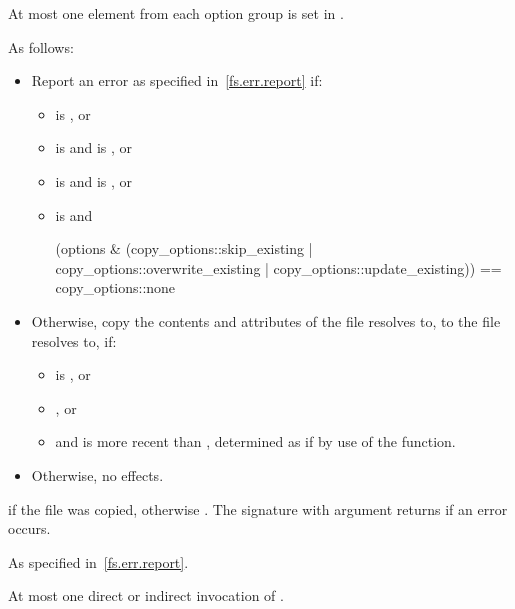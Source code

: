 \begin{itemdescr}
\pnum
\expects
At most one element from each
option group is set
in .

\pnum
\effects
As follows:
\begin{itemize}
\item
Report an error as specified in~\ref{fs.err.report} if:
\begin{itemize}
\item {} is , or
\item {} is  and  is , or
\item {} is  and  is , or
\item {} is  and
\begin{codeblock}
(options & (copy_options::skip_existing |
            copy_options::overwrite_existing |
            copy_options::update_existing)) == copy_options::none
\end{codeblock}
\end{itemize}

\item
Otherwise, copy the contents and attributes of the file 
    resolves to, to the file  resolves to, if:
\begin{itemize}
\item {} is , or
\item {}, or
\item {} and 
      is more recent than , determined as if by use of the  function.
\end{itemize}

\item
Otherwise, no effects.
\end{itemize}

\pnum
\returns
{} if the  file
  was copied, otherwise . The signature with argument  returns
   if an error occurs.

\pnum
\throws
As specified in~\ref{fs.err.report}.

\pnum
\complexity
At most one direct or indirect invocation of .
\end{itemdescr}

